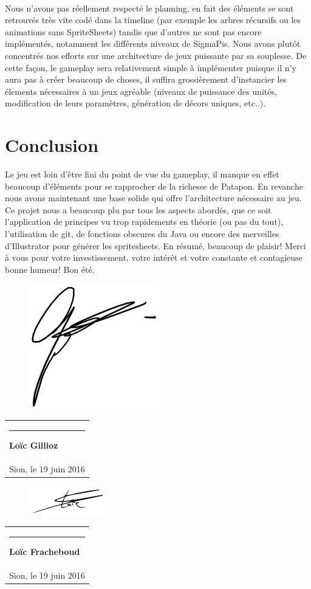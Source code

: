 \documentclass[a4paper,10pt]{article}
\newcommand{\signature}[2]{%
  \par\nobreak\bigskip
  \begin{singlespace}%
  \mbox{}\hfill\begin{tabular}{p{8cm} }
      \rule{8cm}{0.5pt}\newline{}%
        \textbf{#1}\\%
       #2 %
  \end{tabular}%
  \end{singlespace}%
  \medskip%
 }
\begin{document}
 \paragraph{}
 Nous n'avons pas réellement respecté le planning, en fait des éléments se sont retrouvés très vite codé dans la timeline (par exemple les arbres récursifs ou les animations sans SpriteSheets) tandis que d'autres ne sont pas encore implémentés, notamment les différents niveaux de SigmaPis. 
 \newline Nous avons plutôt concentrés nos efforts sur une architecture de jeux puissante par sa souplesse. De cette façon, le gameplay sera relativement simple à implémenter puisque il n'y aura pas à créer beaucoup de choses, il suffira grossièrement d'instancier les élements nécessaires à un jeux agréable (niveaux de puissance des unités, modification de leurs paramètres, génération de décors uniques, etc..).
 
 \pagebreak
 \section{Conclusion}
 Le jeu est loin d'être fini du point de vue du gameplay, il manque en effet beaucoup d'éléments pour se rapprocher de la richesse de Patapon. En revanche nous avons maintenant une base solide qui offre l'architecture nécessaire au jeu.
 \newline Ce projet nous a beaucoup plu par tous les aspects abordés, que ce soit l'application de principes vu trop rapidements en théorie (ou pas du tout), l'utilisation de git, de fonctions obscures du Java ou encore des merveilles d'Illustrator pour générer les spritesheets.
 En résumé, beaucoup de plaisir!
 Merci à vous pour votre investissement, votre intérêt et votre constante et contagieuse bonne humeur!
 Bon été.
 
 \vspace{30pt}
 \begin{figure}
 \vspace{-52pt}
 \centering
 \includegraphics[scale=0.5]{signgillioz}
 \end{figure}
 \signature{Loïc Gillioz}{Sion, le 19 juin 2016} 
 
 \begin{figure}
 \vspace{-52pt}
 \centering
 \includegraphics[scale=1]{signfracheboud}
 \end{figure}
 \signature{Loïc Fracheboud}{Sion, le 19 juin 2016} 
 
\end{document}
